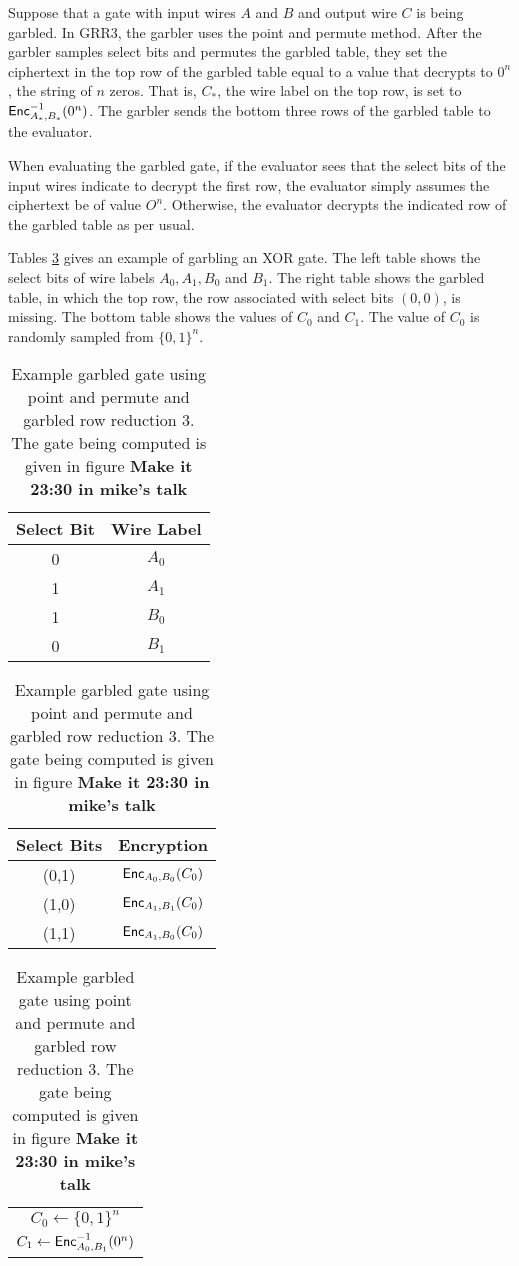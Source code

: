 Suppose that a gate with input wires $A$ and $B$ and output wire $C$ is being garbled.
In GRR3, the garbler uses the point and permute method.
After the garbler samples select bits and permutes the garbled table, they set the ciphertext in the top row of the garbled table equal to a value that decrypts to $0^n$, the string of $n$ zeros.
That is, $C_*$, the wire label on the top row, is set to $\textsf{Enc}^{-1}_{A_*, B_*}(0^n)$.
The garbler sends the bottom three rows of the garbled table to the evaluator.

When evaluating the garbled gate, if the evaluator sees that the select bits of the input wires indicate to decrypt the first row, the evaluator simply assumes the ciphertext be of value $O^n$. 
Otherwise, the evaluator decrypts the indicated row of the garbled table as per usual.

Tables \ref{tbl:grr3} gives an example of garbling an XOR gate.
The left table shows the select bits of wire labels $A_0, A_1, B_0$ and $B_1$.
The right table shows the garbled table, in which the top row, the row associated with select bits $(0,0)$, is missing.
The bottom table shows the values of $C_0$ and $C_1$.
The value of $C_0$ is randomly sampled from $\{0,1\}^n$.

\begin{table}
    \centering
    \begin{tabular}{|c|c|}
        \hline
        Select Bit & Wire Label \\
        \hline
        0 & $A_0$ \\
        1 & $A_1$ \\
        1 & $B_0$ \\
        0 & $B_1$ \\
        \hline
    \end{tabular}
    \qquad
    \begin{tabular}{|c|c|}
        \hline
        Select Bits & Encryption \\
        \hline
        (0,1) & $\textsf{Enc}_{A_0, B_0}(C_0)$ \\
        (1,0) & $\textsf{Enc}_{A_1, B_1}(C_0)$ \\
        (1,1) & $\textsf{Enc}_{A_1, B_0}(C_0)$ \\
        \hline
    \end{tabular}
    \qquad
    \begin{tabular}{|c|}
        \hline
        $C_0 \gets \{0,1\}^n$ \\
        $C_1 \gets \textsf{Enc}_{A_0, B_1}^{-1}(0^n)$ \\
        \hline
    \end{tabular}
    \caption{Example garbled gate using point and permute and garbled row reduction 3. The gate being computed is given in figure \textbf{Make it 23:30 in mike's talk}}
    \label{tbl:grr3}
\end{table}

